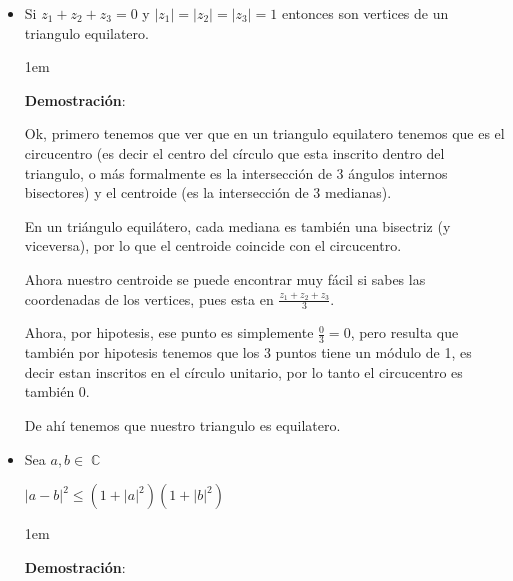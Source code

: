 \documentclass[12pt, fleqn]{report}                             %
\newenvironment{SmallIndentation}[1][0.75em]                    %
    {\begin{adjustwidth}{#1}{}\begin{footnotesize}}                 %
    {\end{footnotesize}\end{adjustwidth}}                           %
\DeclareMathOperator \Complexs  {\mathbb{C}}                     %
\begin{document}
            \begin{itemize}

                \item 
                    Si $z_1 + z_2 + z_3 = 0$ y $|z_1|=|z_2|=|z_3|=1$ entonces son vertices
                    de un triangulo equilatero.

                    \begin{SmallIndentation}[1em]
                        \textbf{Demostración}:
                        
                        Ok, primero tenemos que ver que en un triangulo equilatero tenemos que es
                        el circucentro (es decir el centro del círculo que esta inscrito dentro del
                        triangulo, o más formalmente es la intersección de 3 ángulos internos bisectores)
                        y el centroide (es la intersección de 3 medianas).

                        En un triángulo equilátero, cada mediana es también una bisectriz (y viceversa),
                        por lo que el centroide coincide con el circucentro.

                        Ahora nuestro centroide se puede encontrar muy fácil si sabes las coordenadas
                        de los vertices, pues esta en $\frac{z_1+z_2+z_3}{3}$.

                        Ahora, por hipotesis, ese punto es simplemente $\frac{0}{3} = 0$, pero resulta
                        que también por hipotesis tenemos que los 3 puntos tiene un módulo de 1, es decir
                        estan inscritos en el círculo unitario, por lo tanto el circucentro es también 0.

                        De ahí tenemos que nuestro triangulo es equilatero.

                    \end{SmallIndentation}
                        
                
                \item Sea $a, b \in \Complexs$ 

                    $|a-b|^2 \leq (1+|a|^2)(1+|b|^2)$

                    \begin{SmallIndentation}[1em]
                        \textbf{Demostración}:


\end{SmallIndentation}
\end{itemize}
\end{document}
